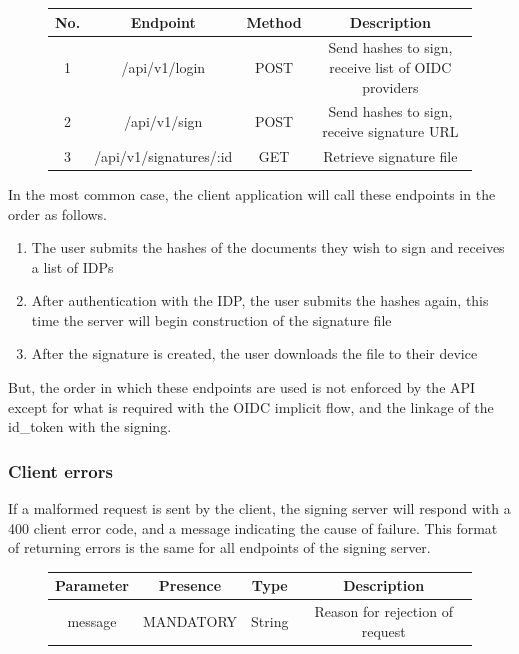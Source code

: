 \begin{figure}[H]
    \begin{center}
        \begin{tabular}{c|c|c|c}
            \textbf{No.} & \textbf{Endpoint} & \textbf{Method} & \textbf{Description} \\
            \hline
            1 & /api/v1/login & POST & Send hashes to sign, receive list of OIDC providers \\
            \hline
            2 & /api/v1/sign & POST & Send hashes to sign, receive signature URL \\
            \hline
            3 & /api/v1/signatures/:id & GET & Retrieve signature file \\
        \end{tabular}
    \end{center}
\end{figure}

In the most common case, the client application will call these endpoints in the order as follows.

\begin{enumerate}
    \item The user submits the hashes of the documents they wish to sign and receives a list of IDPs
    \item After authentication with the IDP, the user submits the hashes again, this time the server will begin construction of the signature file
    \item After the signature is created, the user downloads the file to their device
\end{enumerate}

But, the order in which these endpoints are used is not enforced by the API except for what is required with the \gls{OIDC} implicit flow,
and the linkage of the id\_token with the signing.

\subsubsection{Client errors}\label{apiclienterrors}
If a malformed request is sent by the client, the signing server will respond with a 400 client error code,
and a message indicating the cause of failure.
This format of returning errors is the same for all endpoints of the signing server.

\begin{figure}[H]
    \begin{center}
        \begin{tabular}{c|c|c|c}
            \textbf{Parameter} & \textbf{Presence} & \textbf{Type} & \textbf{Description} \\
            \hline
            message & MANDATORY & String & Reason for rejection of request \\
        \end{tabular}
    \end{center}
\end{figure}


